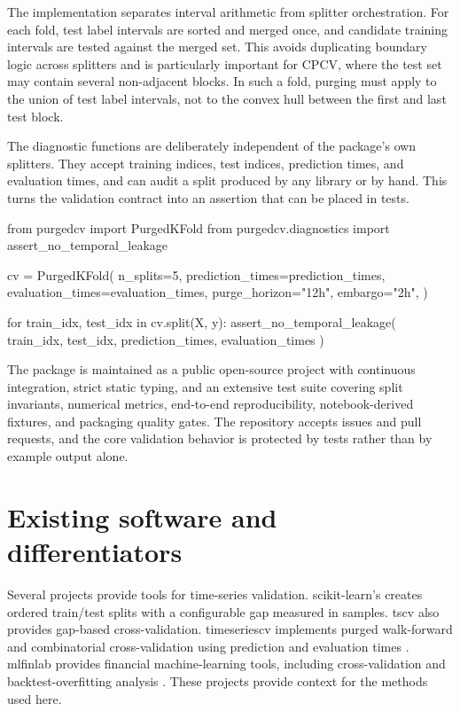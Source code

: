 \documentclass[11pt]{article}
\newcommand{\pkg}[1]{\textsf{#1}}
\DeclareRobustCommand{\code}[1]{\texttt{\detokenize{#1}}}
\begin{document}
The implementation separates interval arithmetic from splitter orchestration.
For each fold, test label intervals are sorted and merged once, and candidate
training intervals are tested against the merged set. This avoids duplicating
boundary logic across splitters and is particularly important for CPCV, where
the test set may contain several non-adjacent blocks. In such a fold, purging
must apply to the union of test label intervals, not to the convex hull between
the first and last test block.

The diagnostic functions are deliberately independent of the package's own
splitters. They accept training indices, test indices, prediction times, and
evaluation times, and can audit a split produced by any library or by hand. This
turns the validation contract into an assertion that can be placed in tests.

\begin{Code}
from purgedcv import PurgedKFold
from purgedcv.diagnostics import assert_no_temporal_leakage

cv = PurgedKFold(
    n_splits=5,
    prediction_times=prediction_times,
    evaluation_times=evaluation_times,
    purge_horizon="12h",
    embargo="2h",
)

for train_idx, test_idx in cv.split(X, y):
    assert_no_temporal_leakage(
        train_idx, test_idx, prediction_times, evaluation_times
    )
\end{Code}

The package is maintained as a public open-source project with continuous
integration, strict static typing, and an extensive test suite covering split
invariants, numerical metrics, end-to-end reproducibility, notebook-derived
fixtures, and packaging quality gates. The repository accepts issues and pull
requests, and the core validation behavior is protected by tests rather than by
example output alone.

\section{Existing software and differentiators}

Several projects provide tools for time-series validation.
\pkg{scikit-learn}'s \code{TimeSeriesSplit} creates ordered train/test splits
with a configurable gap measured in samples. \pkg{tscv} also provides
gap-based cross-validation. \pkg{timeseriescv} implements purged walk-forward
and combinatorial cross-validation using prediction and evaluation times
\citep{timeseriescv2018}. \pkg{mlfinlab} provides financial machine-learning
tools, including cross-validation and backtest-overfitting analysis
\citep{mlfinlab2026}. These projects provide context for the methods used here.
\end{document}
